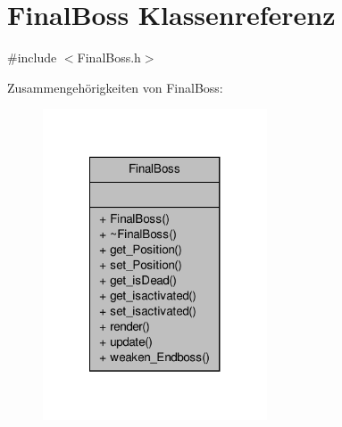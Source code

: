 \hypertarget{class_final_boss}{\section{Final\-Boss Klassenreferenz}
\label{class_final_boss}
}


{\ttfamily \#include $<$Final\-Boss.\-h$>$}



Zusammengehörigkeiten von Final\-Boss\-:
\nopagebreak
\begin{figure}[H]
\begin{center}
\leavevmode
\includegraphics[width=188pt]{class_final_boss__coll__graph}
\end{center}
\end{figure}

